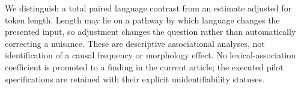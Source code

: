 We distinguish a total paired language contrast from an estimate adjusted for token length. Length may lie
on a pathway by which language changes the presented input, so adjustment changes the question rather than
automatically correcting a nuisance. These are descriptive associational analyses, not identification of a
causal frequency or morphology effect. No lexical-association coefficient is promoted to a finding in the
current article; the executed pilot specifications are retained with their explicit unidentifiability
statuses.
